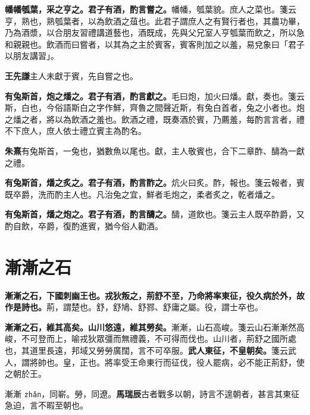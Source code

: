\textbf{幡幡瓠葉，采之亨之。君子有酒，酌言嘗之。}{\footnotesize 幡幡，瓠葉貌。庶人之菜也。箋云亨，熟也，熟瓠葉者，以為飲酒之葅也。此君子謂庶人之有賢行者也，其農功畢，乃為酒漿，以合朋友習禮講道藝也，酒既成，先與父兄室人亨瓠葉而飲之，所以急和親親也。飲酒而曰嘗者，以其為之主於賓客，賓客則加之以羞，易兌象曰「君子以朋友講習」。}

\begin{quoting}\textbf{王先謙}主人未獻于賓，先自嘗之也。\end{quoting}

\textbf{有兔斯首，炮之燔之。君子有酒，酌言獻之。}{\footnotesize 毛曰炮，加火曰燔。獻，奏也。箋云斯，白也，今俗語斯白之字作鮮，齊魯之間聲近斯，有兔白首者，兔之小者也。炮之燔之者，將以為飲酒之羞也。飲酒之禮，既奏酒於賓，乃薦羞，每酌言言者，禮不下庶人，庶人依士禮立賓主為酌名。}

\begin{quoting}\textbf{朱熹}有兔斯首，一兔也，猶數魚以尾也。獻，主人敬賓也，合下二章酢、醻為一獻之禮。\end{quoting}

\textbf{有兔斯首，燔之炙之。君子有酒，酌言酢之。}{\footnotesize 炕火曰炙。酢，報也。箋云報者，賓既卒爵，洗而酌主人也。凡治兔之宜，鮮者毛炮之，柔者炙之，乾者燔之。}

\textbf{有兔斯首，燔之炮之。君子有酒，酌言醻之。}{\footnotesize 醻，道飲也。箋云主人既卒酢爵，又酌自飲，卒爵，復酌進賓，猶今俗人勸酒。}

\section{漸漸之石}


\textbf{漸漸之石，下國刺幽王也。戎狄叛之，荊舒不至，乃命將率東征，役久病於外，故作是詩也。}{\footnotesize 荊，謂楚也。舒，舒鳩、舒鄝、舒庸之屬。役，謂士卒也。}

\textbf{漸漸之石，維其高矣。山川悠遠，維其勞矣。}{\footnotesize 漸漸，山石高峻。箋云山石漸漸然高峻，不可登而上，喻戎狄眾彊而無禮義，不可得而伐也。山川者，荊舒之國所處也，其道里長遠，邦域又勞勞廣闊，言不可卒服。}\textbf{武人東征，不皇朝矣。}{\footnotesize 箋云武人，謂將帥也。皇，正也。將率受王命東行而征伐，役人罷病，必不能正荊舒，使之朝於王。}

\begin{quoting}漸漸 \texttt{zhǎn}，同嶄。勞，同遼。\textbf{馬瑞辰}古者戰多以朝，詩言不遑朝者，甚言其東征急迫，言不暇至朝也。\end{quoting}

